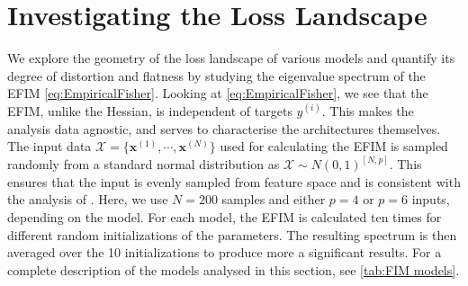 \section{Investigating the Loss Landscape}\label{sec:Investigating the Loss Landscape}
We explore the geometry of the loss landscape of various models and quantify its degree of distortion and flatness by studying the eigenvalue spectrum of the EFIM \autoref{eq:EmpiricalFisher}. Looking at \autoref{eq:EmpiricalFisher}, we see that the EFIM, unlike the Hessian, is independent of targets $y^{(i)}$. This makes the analysis data agnostic, and serves to characterise the architectures themselves. The input data $\mathcal{X} = \{\boldsymbol{x}^{(1)}, \cdots, \boldsymbol{x}^{(N)}\}$ used for calculating the EFIM is sampled randomly from a standard normal distribution as $\mathcal{X} \sim N(0,1)^{[N,p]}$. This ensures that the input is evenly sampled from feature space and is consistent with the analysis of \citet{abbas2020power}. Here, we use $N=200$ samples and either $p=4$ or $p=6$ inputs, depending on the model. For each model, the EFIM is calculated ten times for different random initializations of the parameters. The resulting spectrum is then averaged over the 10 initializations to produce more a significant results. For a complete description of the models analysed in this section, see \autoref{tab:FIM models}.

